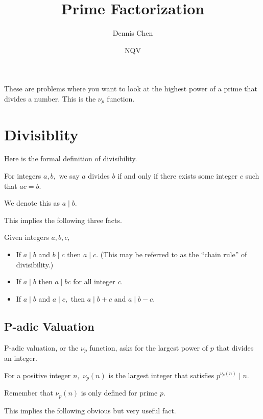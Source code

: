 \documentclass[mast]{lucky}
\title{Prime Factorization}
\author{Dennis Chen}
\date{NQV}
\begin{document}
\maketitle

These are problems where you want to look at the highest power of a prime that divides a number. This is the $\nu_p$ function.

\section{Divisiblity}

Here is the formal definition of divisibility.

\begin{defi}[Divisibility]
For integers $a,b,$ we say $a$ divides $b$ if and only if there exists some integer $c$ such that $ac=b.$

We denote this as $a\mid b.$ %
\end{defi}
This implies the following three facts.

\begin{fact}
Given integers $a,b,c,$
\begin{itemize}
    \item If $a\mid b$ and $b\mid c$ then $a\mid c.$ (This may be referred to as the “chain rule” of divisibility.)
    
    \item If $a\mid b$ then $a\mid bc$ for all integer $c.$
    
    \item If $a\mid b$ and $a\mid c,$ then $a\mid b+c$ and $a\mid b-c.$
\end{itemize}
\end{fact}

\subsection{P-adic Valuation}

P-adic valuation, or the $\nu_p$ function, asks for the largest power of $p$ that divides an integer.

\begin{defi}
For a positive integer $n,$ $\nu_p(n)$ is the largest integer that satisfies $p^{\nu_p(n)}\mid n.$
\end{defi}

Remember that $\nu_p(n)$ is only defined for prime $p.$

This implies the following obvious but very useful fact.
\end{document}
